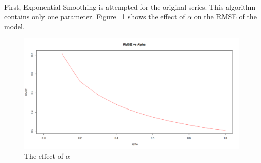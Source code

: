 \documentclass[12pt]{article}
\begin{document}
\paragraph{}
First, Exponential Smoothing is attempted for the original series. This algorithm contains only one parameter. Figure ~\ref{fig:figure18} shows the effect of $\alpha$ on the RMSE of the model.
\begin{figure}[H]
  \centering
  \includegraphics[width=\linewidth]{figure18.png}
  \caption{The effect of $\alpha$}
  \label{fig:figure18}
\end{figure}
\end{document}
